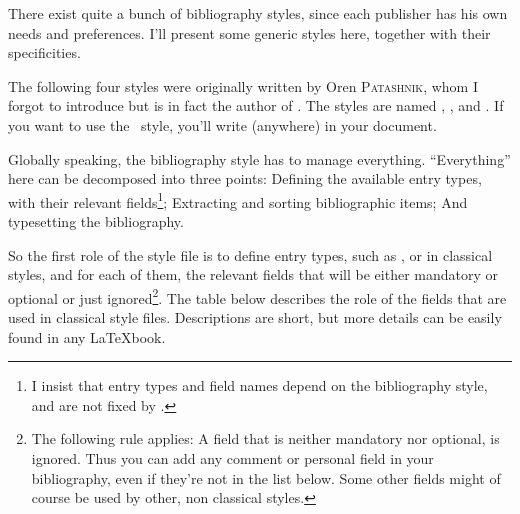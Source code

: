 
There exist quite a bunch
of  bibliography styles, since each publisher has his own
needs 
and preferences. I'll present some generic styles here, together with  their
specificities. 


The following four styles were originally written by Oren
\textsc{Patashnik}, whom I forgot to introduce but is in fact the
author of \bt. The styles are named , ,
 and . If you want to use the
~style, you'll write \verb++ 
(anywhere) in your document.


Globally speaking, the bibliography style has to manage
everything. ``Everything'' here can be decomposed into three points:
Defining the available entry types, with their relevant 
fields\footnote{I insist that entry types and field names depend 
on the bibliography style, and are not fixed by \bt.}; 
Extracting and sorting 
bibliographic items; And typesetting the bibliography.


So the first role of the style file is to define entry types, such as
,  or  in classical styles,
and for each of them, the relevant fields  that will be
either mandatory or optional or just ignored\footnote{The following
  rule applies: A field that is neither mandatory nor optional, is
  ignored. Thus you can add any comment or personal field in your
  bibliography, even if they're not in the list below. Some other
  fields might of course be used by other, non classical styles.}.
The table below describes the role of the fields that are used in
classical style files. Descriptions are short, but more details can be
easily found in any \LaTeX book.\label{champ}


